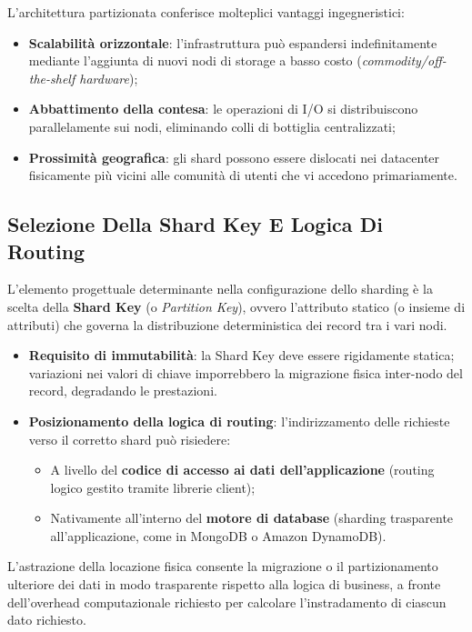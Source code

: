 \documentclass[11pt, a4paper]{article}
\begin{document}
L'architettura partizionata conferisce molteplici vantaggi ingegneristici:
\begin{itemize}[noitemsep]
    \item \textbf{Scalabilità orizzontale}: l'infrastruttura può espandersi indefinitamente mediante l'aggiunta di nuovi nodi di storage a basso costo (\emph{commodity/off-the-shelf hardware});
    \item \textbf{Abbattimento della contesa}: le operazioni di I/O si distribuiscono parallelamente sui nodi, eliminando colli di bottiglia centralizzati;
    \item \textbf{Prossimità geografica}: gli shard possono essere dislocati nei datacenter fisicamente più vicini alle comunità di utenti che vi accedono primariamente.
\end{itemize}

\subsection{Selezione Della Shard Key E Logica Di Routing}

L'elemento progettuale determinante nella configurazione dello sharding è la scelta della \textbf{Shard Key} (o \emph{Partition Key}), ovvero l'attributo statico (o insieme di attributi) che governa la distribuzione deterministica dei record tra i vari nodi.
\begin{itemize}
    \item \textbf{Requisito di immutabilità}: la Shard Key deve essere rigidamente statica; variazioni nei valori di chiave imporrebbero la migrazione fisica inter-nodo del record, degradando le prestazioni.
    \item \textbf{Posizionamento della logica di routing}: l'indirizzamento delle richieste verso il corretto shard può risiedere:
    \begin{itemize}
        \item A livello del \textbf{codice di accesso ai dati dell'applicazione} (routing logico gestito tramite librerie client);
        \item Nativamente all'interno del \textbf{motore di database} (sharding trasparente all'applicazione, come in MongoDB o Amazon DynamoDB).
    \end{itemize}
\end{itemize}

L'astrazione della locazione fisica consente la migrazione o il partizionamento ulteriore dei dati in modo trasparente rispetto alla logica di business, a fronte dell'overhead computazionale richiesto per calcolare l'instradamento di ciascun dato richiesto.
\end{document}
